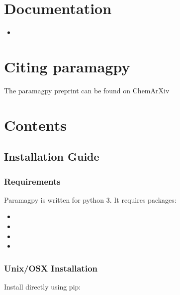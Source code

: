 \documentclass[a4paper,10pt,english,openany,oneside]{sphinxmanual}
\begin{document}
\chapter{Documentation}
\label{\detokenize{index:documentation}}\begin{itemize}
\item {} 

\end{itemize}


\chapter{Citing paramagpy}
\label{\detokenize{index:citing-paramagpy}}
The paramagpy preprint can be found on ChemArXiv 


\chapter{Contents}
\label{\detokenize{index:contents}}

\section{Installation Guide}
\label{\detokenize{install:installation-guide}}\label{\detokenize{install::doc}}

\subsection{Requirements}
\label{\detokenize{install:requirements}}
Paramagpy is written for python 3. It requires packages:
\begin{itemize}
\item {} 

\item {} 

\item {} 

\item {} 

\end{itemize}


\subsection{Unix/OSX Installation}
\label{\detokenize{install:unix-osx-installation}}
Install directly using pip:
\end{document}
